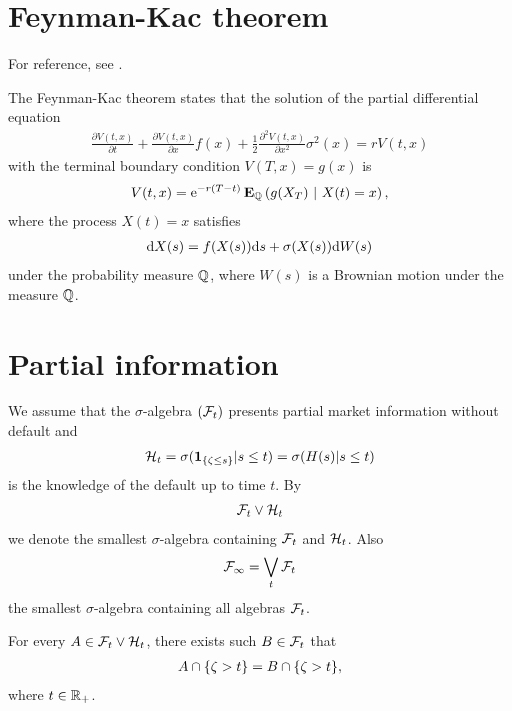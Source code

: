 \section{Feynman-Kac theorem}
\label{sec:faynmankac}

For reference, see \textcite[pp. 145--147]{oksendal2003stochastic}.

The Feynman-Kac theorem states that the solution of the partial differential equation
	\begin{align}
		\frac{\partial V(t,x)}{\partial t} + \frac{\partial V(t,x)}{\partial x} f(x) + \frac{1}{2} \frac{\partial^2 V(t,x)}{\partial x^2} \sigma^2 (x) = r V(t,x)
	\end{align}
with the terminal boundary condition $V(T,x) = g(x)$ is 
	\begin{align}
		V(t,x) = \mathrm{e}^{-r(T-t)} \operatorname{\boldsymbol{\mathrm{E}}}_{\mathbb{Q}} \left( g(X_T) \ | \ X(t) = x \right) ,
	\end{align}
where the process $X(t) = x$ satisfies
	\begin{align}
		\mathrm{d} X(s) = f(X(s)) \mathrm{d} s + \sigma( X(s) ) \mathrm{d} W(s)
	\end{align}
under the probability measure $\mathbb{Q}$, where $W(s)$ is a Brownian motion under the measure $\mathbb{Q}$.

\section{Partial information}

We assume that the $\sigma$-algebra $(\mathcal{F}_t)$ presents partial market information without default and 
\begin{align}
\mathcal{H}_t = \sigma( \boldsymbol{1}_{ \{\zeta \leq s \} } | s \leq t ) = \sigma( H(s) | s \leq t ) 
\end{align}
is the knowledge of the default up to time $t$. By
\begin{align}
\mathcal{F}_t \vee \mathcal{H}_t
\end{align}
we denote the smallest $\sigma$-algebra containing $\mathcal{F}_t$ and $\mathcal{H}_t$. Also
\begin{align}
\mathcal{F}_{\infty} = \bigvee_t \mathcal{F}_t
\end{align}
the smallest $\sigma$-algebra containing all algebras $\mathcal{F}_t$.

\begin{lemma}
	\label{lemma-weaksigmasameness}
	For every $A \in \mathcal{F}_t \vee \mathcal{H}_t$, there exists such $B \in \mathcal{F}_t$ that
	\begin{align}
	\label{eq-weaksigmasameness}
	A \cap \{ \zeta > t \} = B \cap \{ \zeta > t \},
	\end{align}
	where $t \in \mathbb{R}_+$.
\end{lemma}

